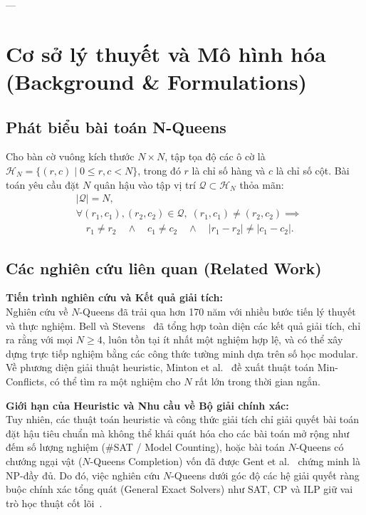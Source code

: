 \documentclass[11pt,a4paper]{article}
\begin{document}
---

\section{Cơ sở lý thuyết và Mô hình hóa (Background \& Formulations)}

\subsection{Phát biểu bài toán N-Queens}
\begin{tcolorbox}[
    colback=boxbg, colframe=boxborder, arc=2mm, boxrule=0.75pt,
    left=10pt, right=10pt, top=7pt, bottom=7pt,
    title=\textbf{\color{primaryblue}Định nghĩa 1 (Bài toán $N$-Queens tiêu chuẩn)},
    coltitle=primaryblue
]
Cho bàn cờ vuông kích thước $N \times N$, tập tọa độ các ô cờ là $\mathcal{H}_N = \{(r, c) \mid 0 \le r, c < N\}$, trong đó $r$ là chỉ số hàng và $c$ là chỉ số cột. Bài toán yêu cầu đặt $N$ quân hậu vào tập vị trí $\mathcal{Q} \subset \mathcal{H}_N$ thỏa mãn:
\begin{align}
    &|\mathcal{Q}| = N, \\
    &\forall (r_1, c_1), (r_2, c_2) \in \mathcal{Q}, \; (r_1, c_1) \neq (r_2, c_2) \implies \nonumber\\
    &\quad r_1 \neq r_2 \quad \land \quad c_1 \neq c_2 \quad \land \quad |r_1 - r_2| \neq |c_1 - c_2|.
\end{align}
\end{tcolorbox}

\subsection{Các nghiên cứu liên quan (Related Work)}

\noindent\textbf{Tiến trình nghiên cứu và Kết quả giải tích:}\\
Nghiên cứu về $N$-Queens đã trải qua hơn 170 năm với nhiều bước tiến lý thuyết và thực nghiệm. Bell và Stevens~\cite{bell2009survey} đã tổng hợp toàn diện các kết quả giải tích, chỉ ra rằng với mọi $N \ge 4$, luôn tồn tại ít nhất một nghiệm hợp lệ, và có thể xây dựng trực tiếp nghiệm bằng các công thức tường minh dựa trên số học modular. Về phương diện giải thuật heuristic, Minton et al.~\cite{minton1992solving} đề xuất thuật toán Min-Conflicts, có thể tìm ra một nghiệm cho $N$ rất lớn trong thời gian ngắn.

\noindent\textbf{Giới hạn của Heuristic và Nhu cầu về Bộ giải chính xác:}\\
Tuy nhiên, các thuật toán heuristic và công thức giải tích chỉ giải quyết bài toán đặt hậu tiêu chuẩn mà không thể khái quát hóa cho các bài toán mở rộng như đếm số lượng nghiệm (\#SAT / Model Counting), hoặc bài toán $N$-Queens có chướng ngại vật ($N$-Queens Completion) vốn đã được Gent et al.~\cite{gent2017complexity} chứng minh là NP-đầy đủ. Do đó, việc nghiên cứu $N$-Queens dưới góc độ các hệ giải quyết ràng buộc chính xác tổng quát (General Exact Solvers) như SAT, CP và ILP giữ vai trò học thuật cốt lõi~\cite{rossi2006handbook,biere2021handbook}. 
\end{document}
